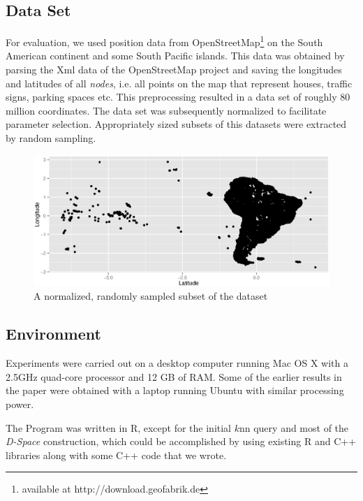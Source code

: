 \documentclass[runningheads]{llncs}
\begin{document}
\subsection{Data Set}
For evaluation, we used position data from OpenStreetMap\footnote{available at http://download.geofabrik.de} on the South American continent and some South Pacific islands. This data was obtained by parsing the Xml data of the OpenStreetMap project and saving the longitudes and latitudes of all \emph{nodes}, i.e. all points on the map that represent houses, traffic signs, parking spaces etc. This preprocessing resulted in a data set of roughly 80 million coordinates. The data set was subsequently normalized to facilitate parameter selection. Appropriately sized subsets of this datasets were extracted by random sampling.
\begin{figure}[H]
\includegraphics[width=.68\textwidth]{images/south-america-osm.eps}
\caption{A normalized, randomly sampled subset of the dataset}
\end{figure}
\subsection{Environment}
Experiments were carried out on a desktop computer running Mac OS X with a 2.5GHz quad-core processor and 12 GB of RAM. Some of the earlier results in the paper were obtained with a laptop running Ubuntu with similar processing power. 

The Program was written in R, except for the initial $k$nn query and most of the \emph{D-Space} construction, which could be accomplished by using existing R and C++ libraries along with some C++ code that we wrote.
\end{document}
